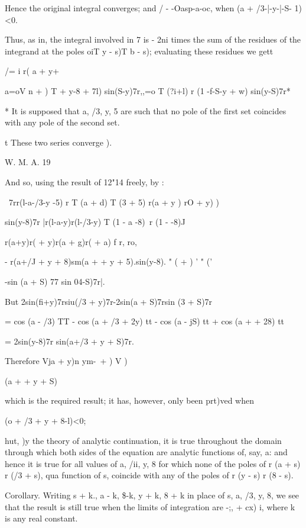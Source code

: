 Hence the original integral converges; and / - -Oasp-a-oc, when (a +
/3-|-y-|-S- 1)<0.

Thus, as in, the integral involved in 7 is - 2ni times the sum
of the residues of the integrand at the poles oiT y - s)T b - s);
evaluating these residues we gett

/= i r( a + y+%

a=oV n + ) T + y-8 + 7l) sin(S-y)7r,,=o T (?i+l) r (1 -f-S-y + w)
sin(y-S)7r*

* It is supposed that a, /3, y, 5 are such that no pole of the first
set coincides with any pole of the second set.

t These two series converge ).

W. M. A. 19

%
%

And so, using the result of 12"14 freely, by :

\ 7rr(l-a-/3-y -5) r T (a + d) T (3 + 5) r(a + y ) rO + y) )

sin(y-8)7r |r(l-a-y)r(l-/3-y) T (1 - a -8)~r (1 - -8)J

r(a+y)r( + y)r(a + g)r( + a) f r, ro,

- r(a+/J + y + 8)sm(a + + y + 5).sin(y-8). " ( + ) ' " ('

-sin (a + S) 77 sin 04-S)7r|.

But 2sin(fi+y)7rsiu(/3 + y)7r-2sin(a + S)7rsin (3 + S)7r

= cos (a - /3) TT - cos (a + /3 + 2y) tt - cos (a - jS) tt + cos (a +
+ 28) tt

= 2sin(y-8)7r sin(a+/3 + y + S)7r.

Therefore Vja + y)n ym-\ + ) V )

 (a + + y + S)

which is the required result; it has, however, only been prt)ved when

 (o + /3 + y + 8-l)<0;

hut, )y the theory of analytic continuation, it is true throughout the
domain through which both sides of the equation are analytic functions
of, say, a: and hence it is true for all values of a, /ii, y, 8 for
which none of the poles of r (a + s) r (/3 + s), qua function of s,
coincide with any of the poles of r (y - s) r (8 - s).

Corollary. Writing s + k., a - k, \$-k, y + k, 8 + k in place of s, a,
/3, y, 8, we see that the result is still true when the limits of
integration are -;, + cx) i, where k is any real constant.

